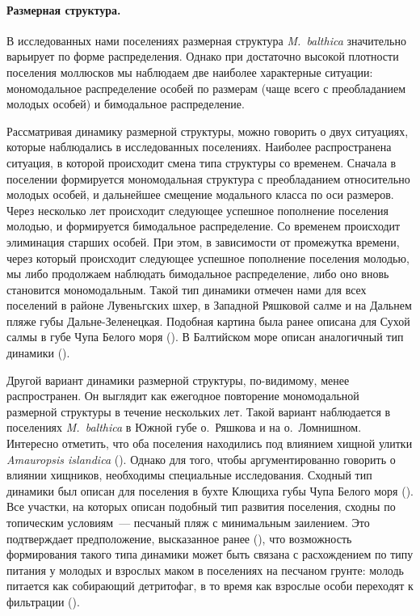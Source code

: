 {%
\paragraph{Размерная структура.}
В исследованных нами поселениях размерная структура \textit{M.~balthica} значительно варьирует по форме распределения.
Однако при достаточно высокой плотности поселения моллюсков мы наблюдаем две наиболее характерные ситуации: мономодальное распределение особей по размерам (чаще всего с преобладанием молодых особей) и бимодальное распределение.

Рассматривая динамику размерной структуры, можно говорить о  двух ситуациях, которые наблюдались в исследованных поселениях.
Наиболее распространена ситуация, в которой происходит смена типа структуры со временем. 
Сначала в поселении формируется мономодальная структура с преобладанием относительно молодых особей, и дальнейшее смещение модального класса по оси размеров. 
Через несколько лет происходит следующее успешное пополнение поселения молодью, и формируется бимодальное распределение.
Со временем происходит элиминация старших особей. 
При этом, в зависимости от промежутка времени, через который происходит следующее успешное пополнение поселения молодью, мы либо продолжаем наблюдать бимодальное распределение, либо оно вновь становится мономодальным.
Такой тип динамики отмечен нами для всех поселений в районе Лувеньгских шхер, в Западной Ряшковой салме  и на Дальнем пляже губы Дальне-Зеленецкая.
Подобная картина была ранее описана для Сухой салмы в губе Чупа Белого моря (\cite{Maximovich_et_al_1991}).
В Балтийском море описан аналогичный тип динамики (\cite{Segerstrale_1969}).

Другой вариант динамики размерной структуры, по-видимому, менее распространен.
Он выглядит как ежегодное повторение мономодальной размерной структуры в течение нескольких лет.
Такой вариант наблюдается в поселениях \textit{M.~balthica} в Южной губе о.~Ряшкова и на о.~Ломнишном.
Интересно отметить, что оба поселения находились под влиянием хищной улитки \textit{Amauropsis islandica} (\cite{Aristov_Granovich_2011}).
Однако для того, чтобы аргументированно говорить о влиянии хищников, необходимы специальные исследования.
Сходный тип динамики был описан для поселения в бухте Клющиха губы Чупа Белого моря (\cite{Maximovich_et_al_1991, Gerasimova_Maximovich_2013}).
Все участки, на которых описан подобный тип развития поселения, сходны по топическим условиям~--- песчаный пляж с минимальным заилением.
Это подтверждает предположение, высказанное ранее (\cite{Gerasimova_Maximovich_2013}), что возможность формирования такого типа динамики может быть связана с расхождением по типу питания у молодых и взрослых маком в поселениях на песчаном грунте: молодь питается как собирающий детритофаг, в то время как взрослые особи переходят к фильтрации (\cite{Gerasimova_1988, Olafsson_1989}).


}
